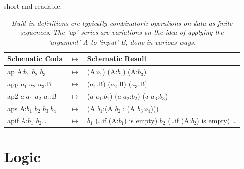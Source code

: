 \documentclass[11pt]{article}
\begin{document}
short and readable.  
\begin{table}
\begin{tabular}{| l  l  l | }
Schematic Coda & $\mapsto$ & Schematic Result \\
\hline
ap A:$b_1$ $b_2$ $b_3$ & $\mapsto$ & (A:$b_1$) (A:$b_2$) (A:$b_3$) \\
app $a_1$ $a_2$ $a_3$:B &  $\mapsto$ & ($a_1$:B) ($a_2$:B) ($a_3$:B) \\
ap2 $a$ $a_1$ $a_2$ $a_3$:B & $\mapsto$ & ($a$ $a_1$:$b_1$) ($a$ $a_2$:$b_2$) ($a$ $a_3$:$b_3$) \\
aps A:$b_1$ $b_2$ $b_3$ $b_4$ & $\mapsto$ & (A $b_1$:(A $b_2$ : (A $b_3$:$b_4$))) \\
apif A:$b_1$ $b_2$\dots & $\mapsto$ & $b_1$ (\dots if (A:$b_1$) is empty) $b_2$ (\dots if (A:$b_2$) is empty) \dots \\
\hline
\end{tabular} 
\caption{\label{ }{\it Built in definitions are typically combinatoric operations on data as finite sequences.  The `ap' series are variations on the 
idea of applying the `argument' A to `input' B, done in various ways.}}   
\end{table}

\section{Logic}
\end{document}
